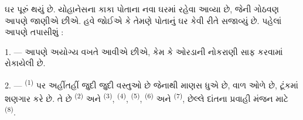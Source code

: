 %
%
%

\VUsaut{6.0mm}
\VUsaut{1.4mm}
\VUsaut{0.4mm}
\VUsaut{2.2mm}

ઘર પૂરું થયું છે. યોહાનેસના કાકા પોતાના નવા ઘરમાં રહેવા આવ્યા છે,
જેની ગોઠવણ આપણે જાણીએ છીએ. હવે જોઈએ કે તેમણે પોતાનું ઘર કેવી રીતે
સજાવ્યું છે. પહેલાં આપણે તપાસીશું :

\VUsaut{3.0mm}

1. --- આપણે અયોગ્ય વખતે આવીએ છીએ, કેમ કે ઓરડાની નોકરાણી
 સાફ કરવામાં રોકાયેલી છે.

2. ---  \textsuperscript{(1)} પર અહીંતહીં જુદી જુદી
વસ્તુઓ છે જેનાથી માણસ ધુએ છે, વાળ ઓળે છે, ટૂંકમાં શણગાર કરે છે. તે છે
 \textsuperscript{(2)} અને 
\textsuperscript{(3)},  \textsuperscript{(4)},
 \textsuperscript{(5)}, 
\textsuperscript{(6)} અને  \textsuperscript{(7)}, છેલ્લે
દાંતના પ્રવાહી મંજન માટે  \textsuperscript{(8)}.

